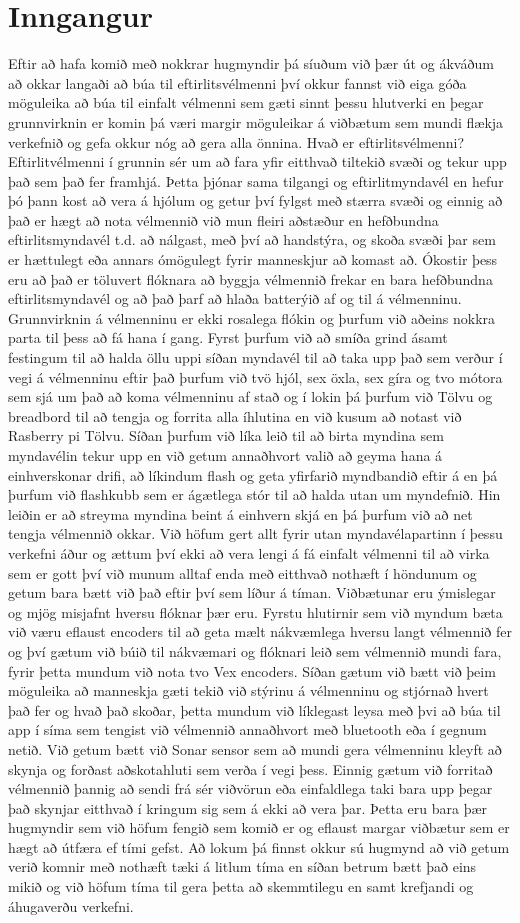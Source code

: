 \section{Inngangur}
Eftir að hafa komið með nokkrar hugmyndir þá síuðum við þær út og ákváðum að okkar langaði að búa til eftirlitsvélmenni því okkur fannst við eiga góða möguleika að búa til einfalt vélmenni sem gæti sinnt þessu hlutverki en þegar grunnvirknin er komin þá væri margir möguleikar á viðbætum sem mundi flækja verkefnið og gefa okkur nóg að gera alla  önnina.
Hvað er eftirlitsvélmenni? Eftirlitvélmenni í grunnin sér um að fara yfir eitthvað tiltekið svæði og tekur upp það sem það fer framhjá. Þetta þjónar sama tilgangi og eftirlitmyndavél en hefur þó þann kost að vera á hjólum og getur því fylgst með stærra svæði og einnig að það er hægt að nota vélmennið við mun fleiri aðstæður en hefðbundna eftirlitsmyndavél t.d. að nálgast, með því að handstýra, og skoða svæði þar sem er hættulegt eða annars ómögulegt fyrir manneskjur að komast að. Ókostir þess eru að það er töluvert flóknara að byggja vélmennið frekar en bara hefðbundna eftirlitsmyndavél og að það þarf að hlaða batterýið af og til á vélmenninu. 
Grunnvirknin á vélmenninu er ekki rosalega flókin og þurfum við aðeins nokkra parta til þess að fá hana í gang. Fyrst þurfum við að smíða grind ásamt festingum til að halda öllu uppi síðan myndavél til að taka upp það sem verður í vegi á vélmenninu eftir það þurfum við tvö hjól, sex öxla, sex gíra og tvo mótora sem sjá um það að koma vélmenninu af stað og í lokin þá þurfum við Tölvu og breadbord til að tengja og forrita alla íhlutina en við kusum að notast við Rasberry pi Tölvu. Síðan þurfum við líka leið til að birta myndina sem myndavélin tekur upp en við getum annaðhvort valið að geyma hana á einhverskonar drifi, að líkindum flash og geta yfirfarið myndbandið eftir á en þá þurfum við flashkubb sem er ágætlega stór til að halda utan um myndefnið. Hin leiðin er að streyma myndina beint á einhvern skjá en þá þurfum við að net tengja vélmennið okkar. Við höfum gert allt fyrir utan myndavélapartinn í þessu verkefni áður og ættum því ekki að vera lengi á fá einfalt vélmenni til að virka sem er gott því við munum alltaf enda með eitthvað nothæft í höndunum og getum bara bætt við það eftir því sem líður á tíman.
Viðbætunar eru ýmislegar og mjög misjafnt hversu flóknar þær eru. Fyrstu hlutirnir sem við myndum bæta við væru eflaust encoders til að geta mælt nákvæmlega hversu langt vélmennið fer og því gætum við búið til nákvæmari og flóknari leið sem vélmennið mundi fara, fyrir þetta mundum við nota tvo Vex encoders. Síðan gætum við bætt við þeim möguleika að manneskja gæti tekið við stýrinu á vélmenninu og stjórnað hvert það fer og hvað það skoðar, þetta mundum við líklegast leysa með þvi að búa til app í síma sem tengist við vélmennið annaðhvort með bluetooth eða í gegnum netið. Við getum bætt við Sonar sensor sem að mundi  gera vélmenninu kleyft að skynja og forðast aðskotahluti sem verða í vegi þess. Einnig gætum við forritað vélmennið þannig að sendi frá sér viðvörun eða einfaldlega taki bara upp þegar það skynjar eitthvað í kringum sig sem á ekki að vera þar. Þetta eru bara þær hugmyndir sem við höfum fengið sem komið er og eflaust margar viðbætur sem er hægt að útfæra ef tími gefst.
Að lokum þá finnst okkur sú hugmynd að við getum verið komnir með nothæft tæki á litlum tíma en síðan betrum bætt það eins mikið og við höfum tíma til gera þetta að skemmtilegu en samt krefjandi og áhugaverðu verkefni.

\begin{figure}[h]
\end{figure}